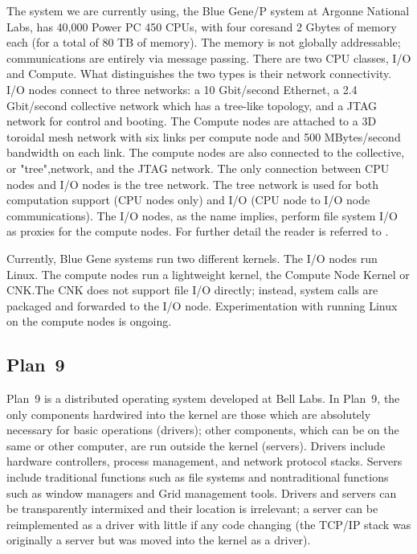 \documentclass[letterpaper,twocolumn,10pt]{article}
\begin{document}
The system we are currently using, the Blue Gene/P system at Argonne National Labs, has 40,000 Power PC 450 CPUs, 
with four coresand 2 Gbytes of memory each (for a total of 80 TB of memory). The memory is not globally addressable; communications are entirely via message passing. 
There are two CPU classes, I/O and Compute. What distinguishes the two types is their network connectivity. I/O nodes connect
to three networks: a 10 Gbit/second Ethernet, a 2.4 Gbit/second collective network which has a tree-like topology, and
a JTAG network for control and booting. The Compute nodes are attached to a 3D toroidal mesh network with six links per compute node and 500 MBytes/second bandwidth on each link.  The compute nodes are also connected to the collective, or "tree",network, and the JTAG network. The only connection between CPU nodes and I/O nodes is the tree network. The tree network is used for both computation support (CPU nodes only) and I/O (CPU node to I/O node communications). The I/O nodes, as the name implies, perform file system I/O as proxies for the 
compute nodes. For further detail the reader is referred to \cite{plan9bgp}. 

Currently, Blue Gene systems run two different kernels. The I/O nodes run Linux. The compute nodes run a lightweight kernel, the Compute Node Kernel or CNK.The CNK does not support file I/O directly; instead, system calls are packaged and forwarded to the I/O node. Experimentation with running Linux on the compute nodes is ongoing. 

\subsection{Plan~9}
Plan~9\cite{Plan9} is a distributed operating system developed at Bell Labs. In Plan~9, the only components hardwired into the kernel are those which are absolutely necessary for basic operations (drivers); other components, which can be on the same or other computer, are run outside the kernel (servers). Drivers include hardware controllers, process management, and network protocol stacks. Servers include traditional functions such as file systems and nontraditional functions such as window managers and Grid management tools. Drivers and servers can be transparently intermixed and their location is irrelevant; a server can be reimplemented as a driver with little if any code changing (the TCP/IP stack was originally a server but was moved into the kernel as a driver).
\end{document}
